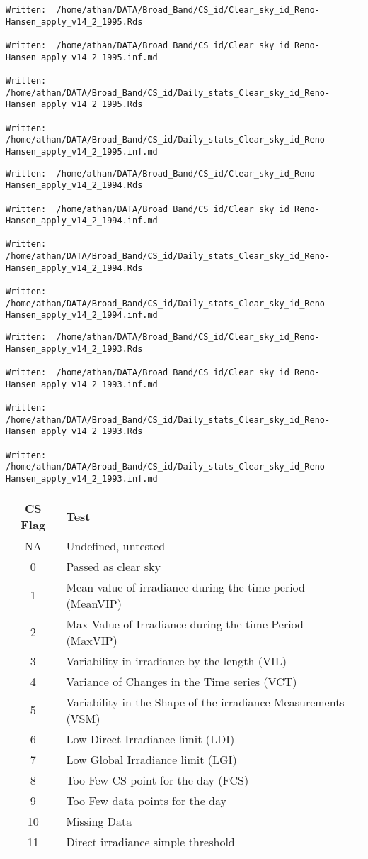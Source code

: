 \documentclass[
  10pt,
  a4paper,oneside]{article}
\begin{document}
\begin{verbatim}
Written:  /home/athan/DATA/Broad_Band/CS_id/Clear_sky_id_Reno-Hansen_apply_v14_2_1995.Rds 

Written:  /home/athan/DATA/Broad_Band/CS_id/Clear_sky_id_Reno-Hansen_apply_v14_2_1995.inf.md 

Written:  /home/athan/DATA/Broad_Band/CS_id/Daily_stats_Clear_sky_id_Reno-Hansen_apply_v14_2_1995.Rds 

Written:  /home/athan/DATA/Broad_Band/CS_id/Daily_stats_Clear_sky_id_Reno-Hansen_apply_v14_2_1995.inf.md 
\end{verbatim}

\begin{verbatim}
Written:  /home/athan/DATA/Broad_Band/CS_id/Clear_sky_id_Reno-Hansen_apply_v14_2_1994.Rds 

Written:  /home/athan/DATA/Broad_Band/CS_id/Clear_sky_id_Reno-Hansen_apply_v14_2_1994.inf.md 

Written:  /home/athan/DATA/Broad_Band/CS_id/Daily_stats_Clear_sky_id_Reno-Hansen_apply_v14_2_1994.Rds 

Written:  /home/athan/DATA/Broad_Band/CS_id/Daily_stats_Clear_sky_id_Reno-Hansen_apply_v14_2_1994.inf.md 
\end{verbatim}

\begin{verbatim}
Written:  /home/athan/DATA/Broad_Band/CS_id/Clear_sky_id_Reno-Hansen_apply_v14_2_1993.Rds 

Written:  /home/athan/DATA/Broad_Band/CS_id/Clear_sky_id_Reno-Hansen_apply_v14_2_1993.inf.md 

Written:  /home/athan/DATA/Broad_Band/CS_id/Daily_stats_Clear_sky_id_Reno-Hansen_apply_v14_2_1993.Rds 

Written:  /home/athan/DATA/Broad_Band/CS_id/Daily_stats_Clear_sky_id_Reno-Hansen_apply_v14_2_1993.inf.md 
\end{verbatim}

\begin{longtable}[]{@{}cl@{}}
\toprule
CS Flag & Test\tabularnewline
\midrule
\endhead
NA & Undefined, untested\tabularnewline
0 & Passed as clear sky\tabularnewline
1 & Mean value of irradiance during the time period (MeanVIP)\tabularnewline
2 & Max Value of Irradiance during the time Period (MaxVIP)\tabularnewline
3 & Variability in irradiance by the length (VIL)\tabularnewline
4 & Variance of Changes in the Time series (VCT)\tabularnewline
5 & Variability in the Shape of the irradiance Measurements (VSM)\tabularnewline
6 & Low Direct Irradiance limit (LDI)\tabularnewline
7 & Low Global Irradiance limit (LGI)\tabularnewline
8 & Too Few CS point for the day (FCS)\tabularnewline
9 & Too Few data points for the day\tabularnewline
10 & Missing Data\tabularnewline
11 & Direct irradiance simple threshold\tabularnewline
\bottomrule
\end{longtable}
\end{document}
